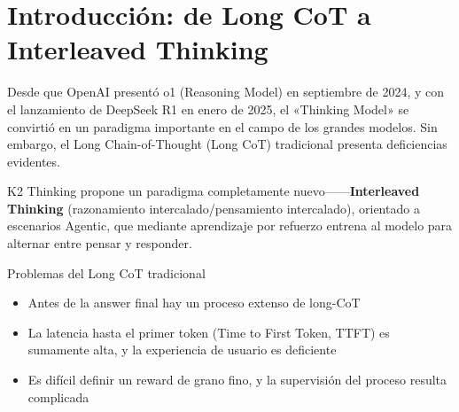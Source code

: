 \section{Introducción: de Long CoT a Interleaved Thinking}

Desde que OpenAI presentó o1 (Reasoning Model) en septiembre de 2024, y con el lanzamiento de DeepSeek R1 en enero de 2025, el «Thinking Model» se convirtió en un paradigma importante en el campo de los grandes modelos. Sin embargo, el Long Chain-of-Thought (Long CoT) tradicional presenta deficiencias evidentes.

K2 Thinking propone un paradigma completamente nuevo------\textbf{Interleaved Thinking} (razonamiento intercalado/pensamiento intercalado), orientado a escenarios Agentic, que mediante aprendizaje por refuerzo entrena al modelo para alternar entre pensar y responder.

\begin{importantbox}{Problemas del Long CoT tradicional}
\begin{itemize}
  \item Antes de la answer final hay un proceso extenso de long-CoT
  \item La latencia hasta el primer token (Time to First Token, TTFT) es sumamente alta, y la experiencia de usuario es deficiente
  \item Es difícil definir un reward de grano fino, y la supervisión del proceso resulta complicada
\end{itemize}
\end{importantbox}

